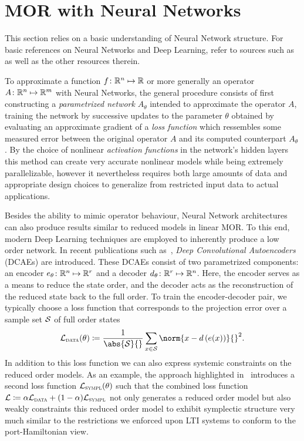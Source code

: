 \section{MOR with Neural Networks}\label{sec:nn-mor}

This section relies on a basic understanding of Neural Network structure.
For basic references on Neural Networks and Deep Learning, refer to sources such as~\cite{Goodfellow2016, Kubat2017, Sarker2021} as well as the other resources therein.

To approximate a function $f \colon \mathbb{R}^n \mapsto \mathbb{R}$ or more generally an operator $A \colon \mathbb{R}^n \mapsto \mathbb{R}^m$ with Neural Networks, the general procedure consists of first constructing a \emph{parametrized network} $A_\theta$ intended to approximate the operator $A$, training the network by successive updates to the parameter $\theta$ obtained by evaluating an approximate gradient of a \emph{loss function} which ressembles some measured error between the original operator $A$ and its computed counterpart $A_\theta$.
By the choice of nonlinear \emph{activation functions} in the network's hidden layers this method can create very accurate nonlinear models while being extremely parallelizable, however it nevertheless requires both large amounts of data and appropriate design choices to generalize from restricted input data to actual applications.

Besides the ability to mimic operator behaviour, Neural Network architectures can also produce results similar to reduced models in linear MOR.
To this end, modern Deep Learning techniques are employed to inherently produce a low order network.
In recent publications such as~\cite{Lee2020, Salvador2021, Benner2022, Kim2022, Buchfink2023}, \emph{Deep Convolutional Autoencoders} (DCAEs) are introduced.
These DCAEs consist of two parametrized components: an encoder $e_\theta \colon \mathbb{R}^n \mapsto \mathbb{R}^r$ and a decoder $d_\theta \colon \mathbb{R}^r \mapsto \mathbb{R}^n$.
Here, the encoder serves as a means to reduce the state order, and the decoder acts as the reconstruction of the reduced state back to the full order.
To train the encoder-decoder pair, we typically choose a loss function that corresponds to the projection error over a sample set $\mathcal{S}$ of full order states
\begin{equation}\label{eq:reduction-loss}
    \mcl{L}_{\msc{data}}(\theta) \coloneqq \frac{1}{\abs{\mcl{S}}{}} \sum\limits_{x \in \mcl{S}} \norm{x - d\left( e(x) \right)}{}^2.
\end{equation}
In addition to this loss function we can also express systemic constraints on the reduced order models.
As an example, the approach highlighted in~\cite{Buchfink2023} introduces a second loss function $\mathcal{L}_{\textnormal{\scshape sympl}}(\theta)$ such that the combined loss function $\mathcal{L} \coloneqq \alpha \mathcal{L}_{\textnormal{\scshape data}} + (1 - \alpha) \mathcal{L}_{\textnormal{\scshape sympl}}$ not only generates a reduced order model but also weakly constraints this reduced order model to exhibit symplectic structure very much similar to the restrictions we enforced upon LTI systems to conform to the port-Hamiltonian view.

